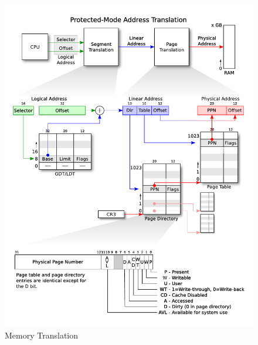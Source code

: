 \documentclass[paper=a4, fontsize=11pt]{report} %
\numberwithin{equation}{section} %
\numberwithin{figure}{section} %
\numberwithin{table}{section} %
\begin{document}
\begin{figure}
	\begin{center}
	\includegraphics[scale=0.5]{./pics/x86_translation.pdf}
	\caption{Memory Translation}
	\label{memtrans}
\end{center}
\end{figure}
\end{document}
